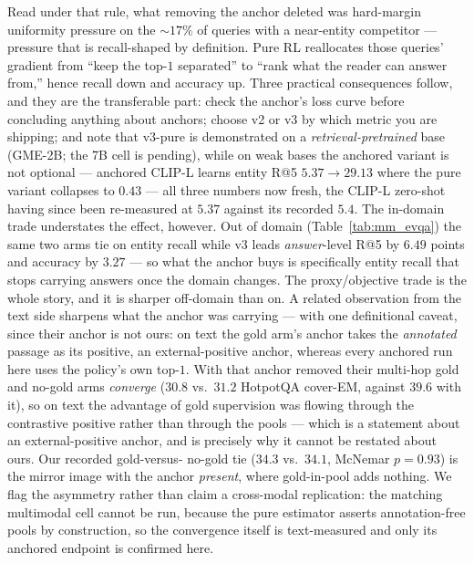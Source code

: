Read under that rule, what removing the anchor deleted was hard-margin uniformity pressure on the
${\sim}17\%$ of queries with a near-entity competitor --- pressure that is recall-shaped by
definition. Pure RL reallocates those queries' gradient from ``keep the top-$1$ separated'' to
``rank what the reader can answer from,'' hence recall down and accuracy up. Three practical
consequences follow, and they are the transferable part: check the anchor's loss curve before
concluding anything about anchors; choose v2 or v3 by which metric you are shipping; and note
that v3-pure is demonstrated on a \emph{retrieval-pretrained} base (\textsc{GME-2B}; the 7B cell
is pending), while on weak bases the anchored variant is not optional --- anchored \textsc{CLIP-L}
learns entity R@5 $5.37 \to 29.13$ where the pure variant collapses to $0.43$ --- all three
numbers now fresh, the \textsc{CLIP-L} zero-shot having since been re-measured at $5.37$ against
its recorded $5.4$.
The in-domain trade understates the effect, however. Out of domain
(Table~\ref{tab:mm_evqa}) the same two arms tie on entity recall while v3 leads
\emph{answer}-level R@5 by $6.49$ points and accuracy by $3.27$ --- so what the anchor buys is
specifically entity recall that stops carrying answers once the domain changes. The
proxy/objective trade is the whole story, and it is sharper off-domain than on. A related
observation from the text side sharpens what the anchor was carrying --- with one definitional
caveat, since their anchor is not ours: on text the gold arm's anchor takes the \emph{annotated}
passage as its positive, an external-positive anchor, whereas every anchored run here uses the
policy's own top-$1$. With that anchor removed their multi-hop gold and no-gold arms
\emph{converge} ($30.8$ vs.\ $31.2$ HotpotQA cover-EM, against $39.6$ with it), so on text the
advantage of gold supervision was flowing through the contrastive positive rather than through
the pools --- which is a statement about an external-positive anchor, and is precisely why it
cannot be restated about ours. Our recorded gold-versus-
no-gold tie ($34.3$ vs.\ $34.1$, McNemar $p{=}0.93$) is the mirror image with the anchor
\emph{present}, where gold-in-pool adds nothing. We flag the asymmetry rather than claim a
cross-modal replication: the matching multimodal cell cannot be run, because the pure estimator
asserts annotation-free pools by construction, so the convergence itself is text-measured and
only its anchored endpoint is confirmed here.

